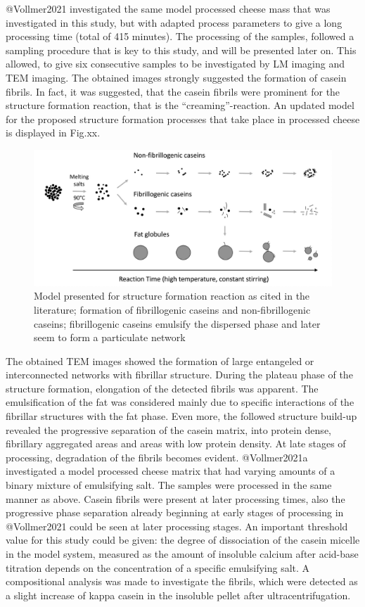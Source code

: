 \documentclass[
]{article}
\begin{document}
@Vollmer2021 investigated the same model processed cheese mass that was
investigated in this study, but with adapted process parameters to give
a long processing time (total of 415 minutes). The processing of the
samples, followed a sampling procedure that is key to this study, and
will be presented later on. This allowed, to give six consecutive
samples to be investigated by LM imaging and TEM imaging. The obtained
images strongly suggested the formation of casein fibrils. In fact, it
was suggested, that the casein fibrils were prominent for the structure
formation reaction, that is the ``creaming''-reaction. An updated model
for the proposed structure formation processes that take place in
processed cheese is displayed in Fig.xx.

\begin{figure}
\centering
\includegraphics{images/str.form_Vollmer.jpg}
\caption{Model presented for structure formation reaction as cited in
the literature; formation of fibrillogenic caseins and non-fibrillogenic
caseins; fibrillogenic caseins emulsify the dispersed phase and later
seem to form a particulate network}
\end{figure}

The obtained TEM images showed the formation of large entangeled or
interconnected networks with fibrillar structure. During the plateau
phase of the structure formation, elongation of the detected fibrils was
apparent. The emulsification of the fat was considered mainly due to
specific interactions of the fibrillar structures with the fat phase.
Even more, the followed structure build-up revealed the progressive
separation of the casein matrix, into protein dense, fibrillary
aggregated areas and areas with low protein density. At late stages of
processing, degradation of the fibrils becomes evident. @Vollmer2021a
investigated a model processed cheese matrix that had varying amounts of
a binary mixture of emulsifying salt. The samples were processed in the
same manner as above. Casein fibrils were present at later processing
times, also the progressive phase separation already beginning at early
stages of processing in @Vollmer2021 could be seen at later processing
stages. An important threshold value for this study could be given: the
degree of dissociation of the casein micelle in the model system,
measured as the amount of insoluble calcium after acid-base titration
depends on the concentration of a specific emulsifying salt. A
compositional analysis was made to investigate the fibrils, which were
detected as a slight increase of kappa casein in the insoluble pellet
after ultracentrifugation.
\end{document}
